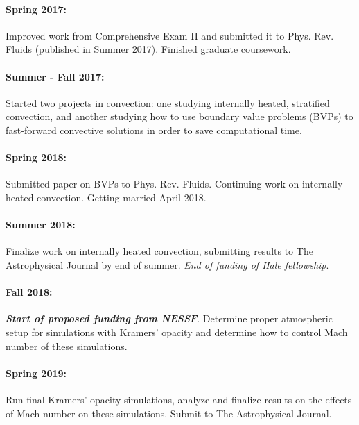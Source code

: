 \documentclass[aasms,12pt]{article}
\begin{document}
\vspace{-0.4cm}
\paragraph{Spring 2017:} Improved work from Comprehensive Exam II and submitted it to Phys.
Rev. Fluids (published in Summer 2017).  Finished graduate coursework.

\vspace{-0.4cm}
\paragraph{Summer - Fall 2017:}  Started two projects in convection: one studying internally heated,
stratified convection, and another studying how to use boundary value problems (BVPs) to fast-forward
convective solutions in order to save computational time.

\vspace{-0.4cm}
\paragraph{Spring 2018:} Submitted paper on BVPs to Phys. Rev. Fluids.  Continuing
work on internally heated convection.  Getting married April 2018.

\vspace{-0.4cm}
\paragraph{Summer 2018:}  Finalize work on internally heated convection, 
submitting results to The Astrophysical Journal by end of summer.  \emph{End of
funding of Hale fellowship}.

\vspace{-0.4cm}
\paragraph{Fall 2018:} \textbf{\emph{Start of proposed funding from NESSF}}. Determine proper
atmospheric setup for simulations with Kramers' opacity and determine how to control
Mach number of these simulations.

\vspace{-0.4cm}
\paragraph{Spring 2019:} Run final Kramers' opacity simulations, analyze and finalize
results on the effects of Mach number on these simulations.  Submit to The Astrophysical Journal.
\end{document}
